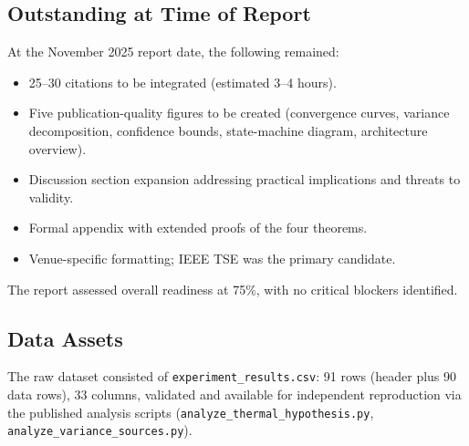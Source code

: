\subsection{Outstanding at Time of Report}

At the November 2025 report date, the following remained:

\begin{itemize}
  \item 25--30 citations to be integrated (estimated 3--4 hours).
  \item Five publication-quality figures to be created
        (convergence curves, variance decomposition, confidence bounds,
        state-machine diagram, architecture overview).
  \item Discussion section expansion addressing practical implications
        and threats to validity.
  \item Formal appendix with extended proofs of the four theorems.
  \item Venue-specific formatting; IEEE TSE was the primary candidate.
\end{itemize}

The report assessed overall readiness at 75\%, with no critical blockers
identified.

\subsection{Data Assets}

The raw dataset consisted of \texttt{experiment\_results.csv}: 91 rows
(header plus 90 data rows), 33 columns, validated and available for
independent reproduction via the published analysis scripts
(\texttt{analyze\_thermal\_hypothesis.py},
\texttt{analyze\_variance\_sources.py}).
